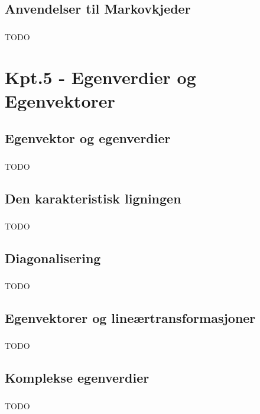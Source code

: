 \documentclass{article}
\begin{document}
    \subsection{Anvendelser til Markovkjeder}
      \subsubsection{}
        TODO
  \section{Kpt.5 - Egenverdier og Egenvektorer}
    \subsection{Egenvektor og egenverdier}
      \subsubsection{}
        TODO
    \subsection{Den karakteristisk ligningen}
      \subsubsection{}
        TODO
    \subsection{Diagonalisering}
      \subsubsection{}
        TODO
    \subsection{Egenvektorer og lineærtransformasjoner}
      \subsubsection{}
        TODO
    \subsection{Komplekse egenverdier}
      \subsubsection{}
        TODO
\end{document}
